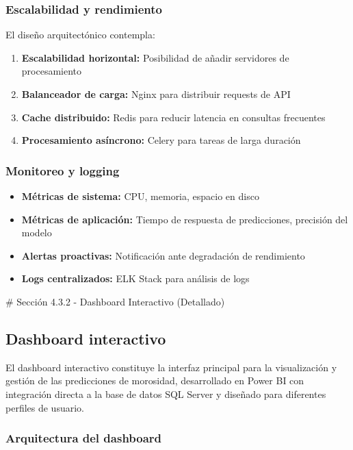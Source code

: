 \subsubsection{Escalabilidad y rendimiento}

El diseño arquitectónico contempla:

\begin{enumerate}
    \item \textbf{Escalabilidad horizontal:} Posibilidad de añadir servidores de procesamiento
    \item \textbf{Balanceador de carga:} Nginx para distribuir requests de API
    \item \textbf{Cache distribuido:} Redis para reducir latencia en consultas frecuentes
    \item \textbf{Procesamiento asíncrono:} Celery para tareas de larga duración
\end{enumerate}

\subsubsection{Monitoreo y logging}

\begin{itemize}
    \item \textbf{Métricas de sistema:} CPU, memoria, espacio en disco
    \item \textbf{Métricas de aplicación:} Tiempo de respuesta de predicciones, precisión del modelo
    \item \textbf{Alertas proactivas:} Notificación ante degradación de rendimiento
    \item \textbf{Logs centralizados:} ELK Stack para análisis de logs
\end{itemize}

\# Sección 4.3.2 - Dashboard Interactivo (Detallado)


\subsection{Dashboard interactivo}

El dashboard interactivo constituye la interfaz principal para la visualización y gestión de las predicciones de morosidad, desarrollado en Power BI con integración directa a la base de datos SQL Server y diseñado para diferentes perfiles de usuario.

\subsubsection{Arquitectura del dashboard}


